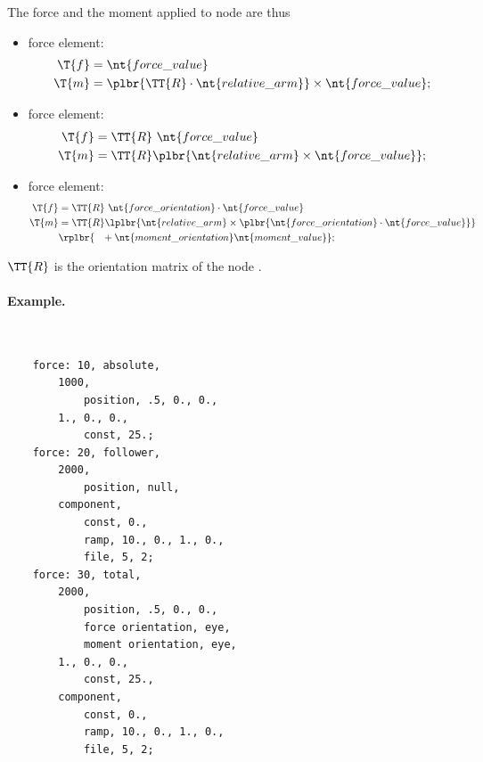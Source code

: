 The force and the moment applied to node  are thus
\begin{itemize}
\item {} force element:
\begin{subequations}
\begin{align}
	\T{f} & = \nt{force\_value} \\
	\T{m} & = \plbr{\TT{R} \cdot \nt{relative\_arm}} \times \nt{force\_value} ;
\end{align}
\end{subequations}

\item {} force element:
\begin{subequations}
\begin{align}
	\T{f} & = \TT{R} \ \nt{force\_value} \\
	\T{m} & = \TT{R} \plbr{\nt{relative\_arm} \times \nt{force\_value}} ;
\end{align}
\end{subequations}

\item {} force element:
\begin{subequations}
\begin{align}
	\T{f} & = \TT{R} \ \nt{force\_orientation} \cdot \nt{force\_value} \\
	\T{m} & = \TT{R} \lplbr{
		\nt{relative\_arm} \times \plbr{ \nt{force\_orientation} \cdot \nt{force\_value}}
	} \nonumber \\
	& \rplbr{\hphantom{= } \mbox{} +
		\nt{moment\_orientation} \nt{moment\_value}
	};
\end{align}
\end{subequations}

\end{itemize}
$\TT{R}$ is the orientation matrix of the node .

\paragraph{Example.} \
\begin{verbatim}
    force: 10, absolute,
        1000,
            position, .5, 0., 0.,
        1., 0., 0.,
            const, 25.;
    force: 20, follower,
        2000,
            position, null,
        component,
            const, 0.,
            ramp, 10., 0., 1., 0.,
            file, 5, 2;
    force: 30, total,
        2000,
            position, .5, 0., 0.,
            force orientation, eye,
            moment orientation, eye,
        1., 0., 0.,
            const, 25.,
        component,
            const, 0.,
            ramp, 10., 0., 1., 0.,
            file, 5, 2;
\end{verbatim}
